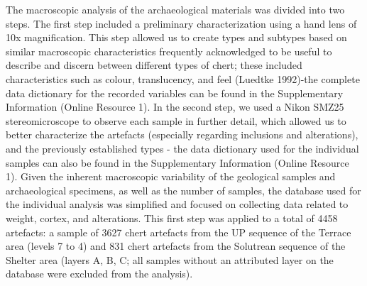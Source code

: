 \documentclass[
  a4paper,
  DIV=11,
  numbers=noendperiod]{scrreprt}
\begin{document}
The macroscopic analysis of the archaeological materials was divided
into two steps. The first step included a preliminary characterization
using a hand lens of 10x magnification. This step allowed us to create
types and subtypes based on similar macroscopic characteristics
frequently acknowledged to be useful to describe and discern between
different types of chert; these included characteristics such as colour,
translucency, and feel (Luedtke 1992)-the complete data dictionary for
the recorded variables can be found in the Supplementary Information
(Online Resource 1). In the second step, we used a Nikon SMZ25
stereomicroscope to observe each sample in further detail, which allowed
us to better characterize the artefacts (especially regarding inclusions
and alterations), and the previously established types - the data
dictionary used for the individual samples can also be found in the
Supplementary Information (Online Resource 1). Given the inherent
macroscopic variability of the geological samples and archaeological
specimens, as well as the number of samples, the database used for the
individual analysis was simplified and focused on collecting data
related to weight, cortex, and alterations. This first step was applied
to a total of 4458 artefacts: a sample of 3627 chert artefacts from the
UP sequence of the Terrace area (levels 7 to 4) and 831 chert artefacts
from the Solutrean sequence of the Shelter area (layers A, B, C; all
samples without an attributed layer on the database were excluded from
the analysis).
\end{document}
